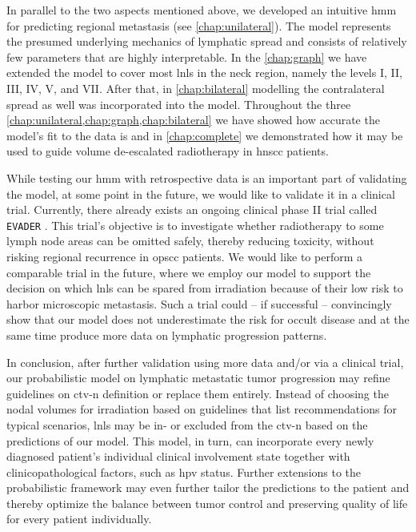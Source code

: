 \documentclass[\relativeRoot/main.tex]{subfiles}
\begin{document}
In parallel to the two aspects mentioned above, we developed an intuitive \gls{hmm} for predicting regional metastasis (see \cref{chap:unilateral}). The model represents the presumed underlying mechanics of lymphatic spread and consists of relatively few parameters that are highly interpretable. In the \cref{chap:graph} we have extended the model to cover most \glspl{lnl} in the neck region, namely the levels I, II, III, IV, V, and VII. After that, in \cref{chap:bilateral} modelling the contralateral spread as well was incorporated into the model. Throughout the three \cref{chap:unilateral,chap:graph,chap:bilateral} we have showed how accurate the model's fit to the data is and in \cref{chap:complete} we demonstrated how it may be used to guide volume de-escalated radiotherapy in \gls{hnscc} patients.

While testing our \gls{hmm} with retrospective data is an important part of validating the model, at some point in the future, we would like to validate it in a clinical trial. Currently, there already exists an ongoing clinical phase II trial called \texttt{EVADER} \cite{bratman_-escalation_nodate}. This trial's objective is to investigate whether radiotherapy to some lymph node areas can be omitted safely, thereby reducing toxicity, without risking regional recurrence in \gls{opscc} patients. We would like to perform a comparable trial in the future, where we employ our model to support the decision on which \glspl{lnl} can be spared from irradiation because of their low risk to harbor microscopic metastasis. Such a trial could -- if successful -- convincingly show that our model does not underestimate the risk for occult disease and at the same time produce more data on lymphatic progression patterns.

In conclusion, after further validation using more data and/or via a clinical trial, our probabilistic model on lymphatic metastatic tumor progression may refine guidelines on \gls{ctv-n} definition or replace them entirely. Instead of choosing the nodal volumes for irradiation based on guidelines that list recommendations for typical scenarios, \glspl{lnl} may be in- or excluded from the \gls{ctv-n} based on the predictions of our model. This model, in turn, can incorporate every newly diagnosed patient's individual clinical involvement state together with clinicopathological factors, such as \acrshort{hpv} status. Further extensions to the probabilistic framework may even further tailor the predictions to the patient and thereby optimize the balance between tumor control and preserving quality of life for every patient individually.
\end{document}

